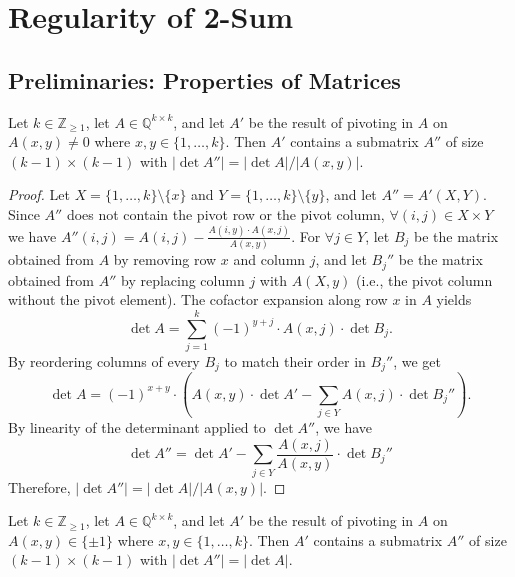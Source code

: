 \section{Regularity of 2-Sum}

\subsection{Preliminaries: Properties of Matrices}

\begin{lemma}\label{lem:pivot_nz_abs_det_eq}
    Let $k \in \mathbb{Z}_{\geq 1}$, let $A \in \mathbb{Q}^{k \times k}$, and let $A'$ be the result of pivoting in $A$ on $A (x, y) \neq 0$ where $x, y \in \{1, \dots, k\}$. Then $A'$ contains a submatrix $A''$ of size $(k - 1) \times (k - 1)$ with $|\det A''| = |\det A| / |A (x, y)|$.
\end{lemma}

\begin{proof}
    Let $X = \{1, \dots, k\} \setminus \{x\}$ and $Y = \{1, \dots, k\} \setminus \{y\}$, and let $A'' = A' (X, Y)$. Since $A''$ does not contain the pivot row or the pivot column, $\forall (i, j) \in X \times Y$ we have $A'' (i, j) = A (i, j) - \frac{A (i, y) \cdot A (x, j)}{A (x, y)}$. For $\forall j \in Y$, let $B_{j}$ be the matrix obtained from $A$ by removing row $x$ and column $j$, and let $B_{j}''$ be the matrix obtained from $A''$ by replacing column $j$ with $A (X, y)$ (i.e., the pivot column without the pivot element). The cofactor expansion along row $x$ in $A$ yields
    \[
        \det A = \sum_{j = 1}^{k} (-1)^{y + j} \cdot A (x, j) \cdot \det B_{j}.
    \]
    By reordering columns of every $B_{j}$ to match their order in $B_{j}''$, we get
    \[
        \det A = (-1)^{x + y} \cdot \left( A (x, y) \cdot \det A' - \sum_{j \in Y} A (x, j) \cdot \det B_{j}'' \right).
    \]
    By linearity of the determinant applied to $\det A''$, we have
    \[
        \det A'' = \det A' - \sum_{j \in Y} \frac{A (x, j)}{A (x, y)} \cdot \det B_{j}''
    \]
    Therefore, $|\det A''| = |\det A| / |A (x, y)|$.
\end{proof}

\begin{lemma}\label{lem:pivot_pn_abs_det_eq}
    Let $k \in \mathbb{Z}_{\geq 1}$, let $A \in \mathbb{Q}^{k \times k}$, and let $A'$ be the result of pivoting in $A$ on $A (x, y) \in \{\pm 1\}$ where $x, y \in \{1, \dots, k\}$. Then $A'$ contains a submatrix $A''$ of size $(k - 1) \times (k - 1)$ with $|\det A''| = |\det A|$.
\end{lemma}

